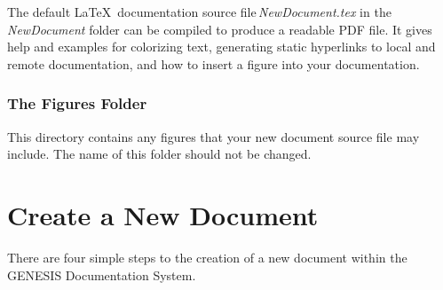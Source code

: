 \documentclass[12pt]{article}
\begin{document}
The default \LaTeX\, documentation source file\,{\it NewDocument.tex} in the {\it NewDocument} folder can be compiled to produce a readable PDF file. It gives help and examples for colorizing text, generating static hyperlinks to local and remote documentation, and how to insert a figure into your documentation.

\subsubsection*{The Figures Folder}

This directory contains any figures that your new document source file may include. The name of this folder should not be changed.
 
\section*{Create a New Document}

There are four simple steps to the creation of a new document within the GENESIS Documentation System.
\end{document}

